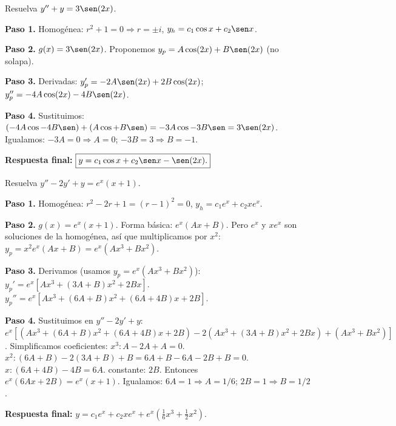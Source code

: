 \begin{example}
Resuelva $y'' + y = 3\sen(2x)$.

\begin{myproof}
\textbf{Paso 1.} Homogénea: $r^2+1=0 \Rightarrow r=\pm i$, $y_h = c_1 \cos x + c_2 \sen x$.

\textbf{Paso 2.} $g(x)=3\sen(2x)$. Proponemos $y_p = A\cos(2x) + B\sen(2x)$ (no solapa).

\textbf{Paso 3.} Derivadas: $y_p' = -2A\sen(2x)+2B\cos(2x)$; $y_p'' = -4A\cos(2x)-4B\sen(2x)$.

\textbf{Paso 4.} Sustituimos: $(-4A\cos -4B\sen) + (A\cos + B\sen) = -3A\cos -3B\sen = 3\sen(2x)$.
Igualamos: $-3A = 0 \Rightarrow A=0$; $-3B = 3 \Rightarrow B=-1$.

\textbf{Respuesta final:} $\boxed{y = c_1 \cos x + c_2 \sen x - \sen(2x).}$
\end{myproof}
\end{example}

\begin{example}
Resuelva $y'' - 2y' + y = e^x (x+1)$.

\begin{myproof}
\textbf{Paso 1.} Homogénea: $r^2 - 2r + 1 = (r-1)^2=0$, $y_h = c_1 e^x + c_2 x e^x$.

\textbf{Paso 2.} $g(x)=e^x(x+1)$. Forma básica: $e^x(Ax+B)$. Pero $e^x$ y $x e^x$ son soluciones de la homogénea, así que multiplicamos por $x^2$: $y_p = x^2 e^x (Ax+B) = e^x(Ax^3 + Bx^2)$.

\textbf{Paso 3.} Derivamos (usamos $y_p = e^x (Ax^3+Bx^2)$):
$y_p' = e^x[Ax^3 + (3A+B)x^2 + 2Bx]$.
$y_p'' = e^x[Ax^3 + (6A+B)x^2 + (6A+4B)x + 2B]$.

\textbf{Paso 4.} Sustituimos en $y'' -2y' + y$:
$e^x[ (Ax^3+(6A+B)x^2+(6A+4B)x+2B) - 2(Ax^3+(3A+B)x^2+2Bx) + (Ax^3+Bx^2) ]$.
Simplificamos coeficientes:
$x^3: A-2A+A=0$.
$x^2: (6A+B) - 2(3A+B) + B = 6A+B-6A-2B+B = 0$.
$x: (6A+4B) - 4B = 6A$.
constante: $2B$.
Entonces $e^x(6A x + 2B) = e^x(x+1)$.
Igualamos: $6A=1 \Rightarrow A=1/6$; $2B=1 \Rightarrow B=1/2$.

\textbf{Respuesta final:} $\boxed{y = c_1 e^x + c_2 x e^x + e^x\left(\frac{1}{6}x^3 + \frac{1}{2}x^2\right).}$
\end{myproof}
\end{example}

